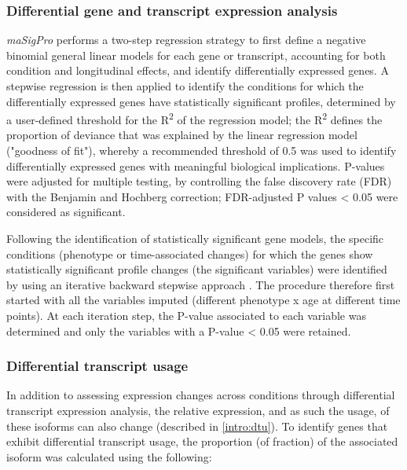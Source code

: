 \subsubsection{Differential gene and transcript expression analysis}
\textit{maSigPro} performs a two-step regression strategy to first define a negative binomial general linear models\cite{Nueda2014} for each gene or transcript, accounting for both condition and longitudinal effects, and identify differentially expressed genes. A stepwise regression is then applied to identify the conditions for which the differentially expressed genes have statistically significant profiles, determined by a user-defined threshold for the R\textsuperscript{2} of the regression model; the R\textsuperscript{2} defines the proportion of deviance that was explained by the linear regression model ("goodness of fit"), whereby a recommended threshold of 0.5 was used to identify differentially expressed genes with meaningful biological implications\cite{Conesa2006}. P-values were adjusted for multiple testing, by controlling the false discovery rate (FDR) with the Benjamin and Hochberg correction; FDR-adjusted P values < 0.05 were considered as significant.

Following the identification of statistically significant gene models, the specific conditions (phenotype or time-associated changes) for which the genes show statistically significant profile changes (the significant variables) were identified by using an iterative backward stepwise approach \cite{Conesa2017}. The procedure therefore first started with all the variables imputed (different phenotype x age at different time points). At each iteration step, the P-value associated to each variable was determined and only the variables with a P-value < 0.05 were retained. 

\subsubsection{Differential transcript usage}
\label{ch:diu_method}
In addition to assessing expression changes across conditions through differential transcript expression analysis, the relative expression, and as such the usage, of these isoforms can also change (described in \cref{intro:dtu}). To identify genes that exhibit differential transcript usage, the proportion (of fraction) of the associated isoform was calculated using the following:

